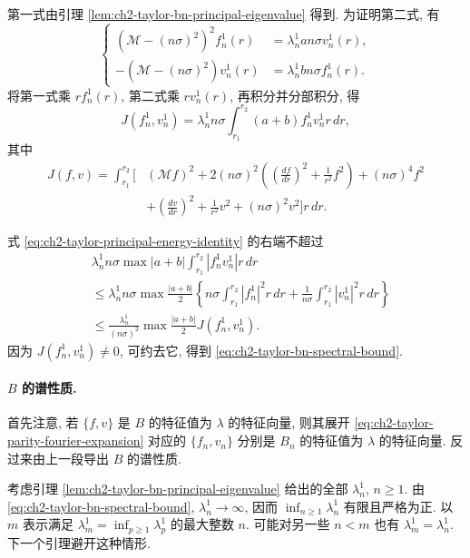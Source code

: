 \begin{Proof}
第一式由引理 \ref{lem:ch2-taylor-bn-principal-eigenvalue} 得到. 为证明第二式, 有
\begin{equation}
\left\{
\begin{aligned}
(\mathcal M-(n\sigma)^2)^2f_n^1(r)&=\lambda_n^1an\sigma v_n^1(r),\\
-(\mathcal M-(n\sigma)^2)v_n^1(r)&=\lambda_n^1bn\sigma f_n^1(r).
\end{aligned}
\right.
\label{eq:ch2-taylor-principal-eigen-system}
\end{equation}
将第一式乘 $rf_n^1(r)$, 第二式乘 $rv_n^1(r)$, 再积分并分部积分, 得
\begin{equation}
J(f_n^1,v_n^1)
=\lambda_n^1n\sigma\int_{r_1}^{r_2}(a+b)f_n^1v_n^1r\,dr,
\label{eq:ch2-taylor-principal-energy-identity}
\end{equation}
其中
\[
\begin{aligned}
J(f,v)=\int_{r_1}^{r_2}\biggl[&(\mathcal Mf)^2
+2(n\sigma)^2\left(\left(\frac{df}{dr}\right)^2+\frac1{r^2}f^2\right)
+(n\sigma)^4f^2\\
&+\left(\frac{dv}{dr}\right)^2+\frac1{r^2}v^2+(n\sigma)^2v^2\biggr]r\,dr.
\end{aligned}
\]

\hypertarget{chapter-02-page-176}{}
式 \eqref{eq:ch2-taylor-principal-energy-identity} 的右端不超过
\[
\begin{aligned}
&\lambda_n^1n\sigma\max|a+b|
\int_{r_1}^{r_2}|f_n^1v_n^1|r\,dr\\
&\leq\lambda_n^1n\sigma\max\frac{|a+b|}{2}
\left\{n\sigma\int_{r_1}^{r_2}|f_n^1|^2r\,dr
+\frac1{n\sigma}\int_{r_1}^{r_2}|v_n^1|^2r\,dr\right\}\\
&\leq\frac{\lambda_n^1}{(n\sigma)^2}
\max\frac{|a+b|}{2}J(f_n^1,v_n^1).
\end{aligned}
\]
因为 $J(f_n^1,v_n^1)\ne0$, 可约去它, 得到 \eqref{eq:ch2-taylor-bn-spectral-bound}.
\end{Proof}

\paragraph{$B$ 的谱性质.}
首先注意, 若 $\{f,v\}$ 是 $B$ 的特征值为 $\lambda$ 的特征向量, 则其展开 \eqref{eq:ch2-taylor-parity-fourier-expansion} 对应的 $\{f_n,v_n\}$ 分别是 $B_n$ 的特征值为 $\lambda$ 的特征向量. 反过来由上一段导出 $B$ 的谱性质.

考虑引理 \ref{lem:ch2-taylor-bn-principal-eigenvalue} 给出的全部 $\lambda_n^1$, $n\geq1$. 由 \eqref{eq:ch2-taylor-bn-spectral-bound}, $\lambda_n^1\to\infty$, 因而 $\inf_{n\geq1}\lambda_n^1$ 有限且严格为正. 以 $m$ 表示满足 $\lambda_m^1=\inf_{p\geq1}\lambda_p^1$ 的最大整数 $n$. 可能对另一些 $n<m$ 也有 $\lambda_m^1=\lambda_n^1$. 下一个引理避开这种情形.

